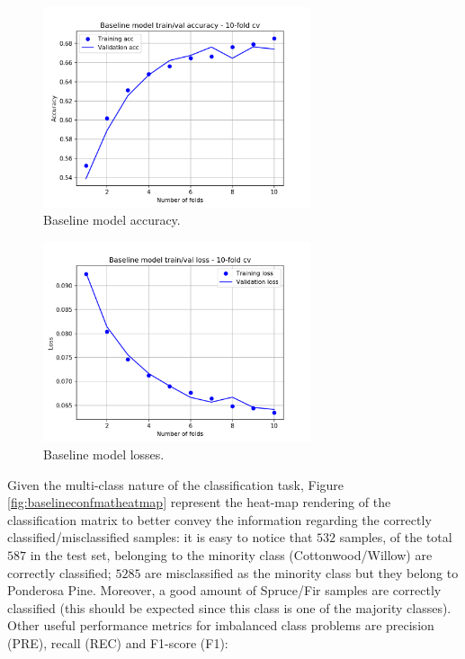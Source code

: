 \begin{figure}
\centering
\includegraphics[width=0.7\textwidth]{./TeX_files/img/baselinemodelacc.png}
\caption{Baseline model accuracy.}
\label{fig:baselinemodelacc}
\end{figure}
\begin{figure}
\centering
\includegraphics[width=0.7\textwidth]{./TeX_files/img/baselinemodelloss.png}
\caption{Baseline model losses.}
\label{fig:baselinemodelloss}
\end{figure}
Given the multi-class nature of the classification task, Figure \ref{fig:baselineconfmatheatmap} represent the heat-map rendering of the classification matrix to better convey the information regarding the correctly classified/misclassified samples: it is easy to notice that $532$ samples, of the total $587$ in the test set, belonging to the minority class (Cottonwood/Willow) are correctly classified; $5285$ are misclassified as the minority class but they belong to Ponderosa Pine. Moreover, a good amount of Spruce/Fir samples are correctly classified (this should be expected since this class is one of the majority classes). Other useful performance metrics for imbalanced class problems are precision (PRE), recall (REC) and F1-score (F1):
